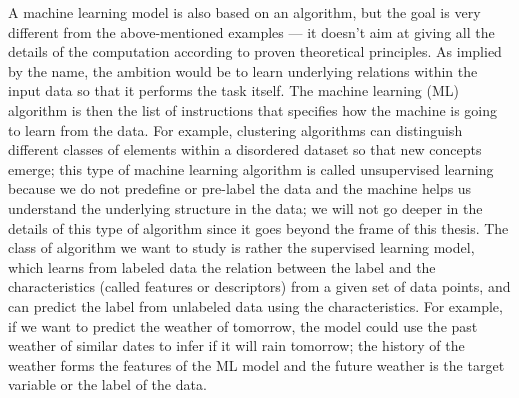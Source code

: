 \documentclass[main]{subfiles}
\begin{document}
A machine learning model is also based on an algorithm, but the goal is very different from the above-mentioned examples --- it doesn't aim at giving all the details of the computation according to proven theoretical principles. As implied by the name, the ambition would be to learn underlying relations within the input data so that it performs the task itself. The machine learning (ML) algorithm is then the list of instructions that specifies how the machine is going to learn from the data. For example, clustering algorithms can distinguish different classes of elements within a disordered dataset so that new concepts emerge; this type of machine learning algorithm is called unsupervised learning because we do not predefine or pre-label the data and the machine helps us understand the underlying structure in the data; we will not go deeper in the details of this type of algorithm since it goes beyond the frame of this thesis. The class of algorithm we want to study is rather the supervised learning model, which learns from labeled data the relation between the label and the characteristics (called features or descriptors) from a given set of data points, and can predict the label from unlabeled data using the characteristics. For example, if we want to predict the weather of tomorrow, the model could use the past weather of similar dates to infer if it will rain tomorrow; the history of the weather  forms the features of the ML model and the future weather is the target variable or the label of the data.
\end{document}
